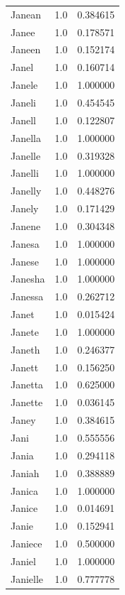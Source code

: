 \documentclass[
  letterpaper,
  DIV=11,
  numbers=noendperiod]{scrreprt}
\begin{document}
\begin{tabular}{lrr}
Janean          &   1.0 &   0.384615 \\
Janee           &   1.0 &   0.178571 \\
Janeen          &   1.0 &   0.152174 \\
Janel           &   1.0 &   0.160714 \\
Janele          &   1.0 &   1.000000 \\
Janeli          &   1.0 &   0.454545 \\
Janell          &   1.0 &   0.122807 \\
Janella         &   1.0 &   1.000000 \\
Janelle         &   1.0 &   0.319328 \\
Janelli         &   1.0 &   1.000000 \\
Janelly         &   1.0 &   0.448276 \\
Janely          &   1.0 &   0.171429 \\
Janene          &   1.0 &   0.304348 \\
Janesa          &   1.0 &   1.000000 \\
Janese          &   1.0 &   1.000000 \\
Janesha         &   1.0 &   1.000000 \\
Janessa         &   1.0 &   0.262712 \\
Janet           &   1.0 &   0.015424 \\
Janete          &   1.0 &   1.000000 \\
Janeth          &   1.0 &   0.246377 \\
Janett          &   1.0 &   0.156250 \\
Janetta         &   1.0 &   0.625000 \\
Janette         &   1.0 &   0.036145 \\
Janey           &   1.0 &   0.384615 \\
Jani            &   1.0 &   0.555556 \\
Jania           &   1.0 &   0.294118 \\
Janiah          &   1.0 &   0.388889 \\
Janica          &   1.0 &   1.000000 \\
Janice          &   1.0 &   0.014691 \\
Janie           &   1.0 &   0.152941 \\
Janiece         &   1.0 &   0.500000 \\
Janiel          &   1.0 &   1.000000 \\
Janielle        &   1.0 &   0.777778 \\

\end{tabular}
\end{document}
